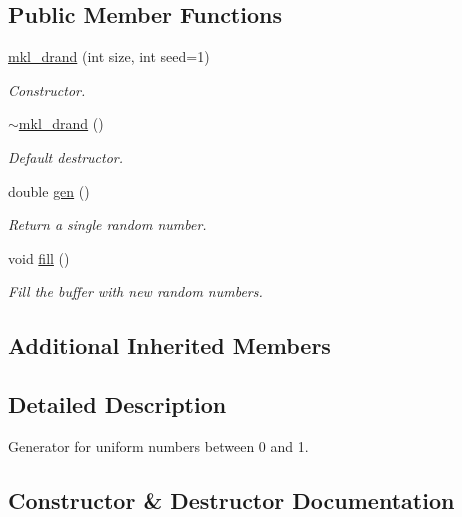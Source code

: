 \subsection*{Public Member Functions}
\begin{DoxyCompactItemize}
\item 
\hyperlink{classmklrand_1_1mkl__drand_a2323c7fd79833d4e7920ec547625fe8b}{mkl\+\_\+drand} (int size, int seed=1)
\begin{DoxyCompactList}\small\item\em Constructor. \end{DoxyCompactList}\item 
\hyperlink{classmklrand_1_1mkl__drand_a4f6c0055cee5c0e5b9a82d95274bd0f5}{$\sim$mkl\+\_\+drand} ()
\begin{DoxyCompactList}\small\item\em Default destructor. \end{DoxyCompactList}\item 
double \hyperlink{classmklrand_1_1mkl__drand_a10d87b78fbb613e522b2429abf2c6097}{gen} ()
\begin{DoxyCompactList}\small\item\em Return a single random number. \end{DoxyCompactList}\item 
void \hyperlink{classmklrand_1_1mkl__drand_a085cf75b8a2330f2a3c368fff80ff478}{fill} ()
\begin{DoxyCompactList}\small\item\em Fill the buffer with new random numbers. \end{DoxyCompactList}\end{DoxyCompactItemize}
\subsection*{Additional Inherited Members}


\subsection{Detailed Description}
Generator for uniform numbers between 0 and 1. 

\subsection{Constructor \& Destructor Documentation}

